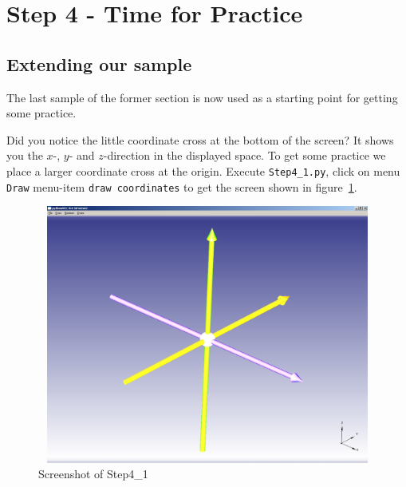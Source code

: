 \section{Step 4 - Time for Practice}
\subsection{Extending our sample}
The last sample of the former section is now used as a starting point for getting some practice.

Did you notice the little coordinate cross at the bottom of the screen? 
It shows you the $x$-, $y$- and $z$-direction in the displayed space.
To get some practice we place a larger coordinate cross at the origin.
Execute {\tt Step4\_1.py}, click on menu {\tt Draw} menu-item  {\tt draw coordinates} to get the screen shown in figure~\ref{STEP_4_1_SCREEN}.
\begin{figure}[h]
\begin{center}
\includegraphics[height=8.5cm,width=11.3cm]{Step4_1.jpg}
\end{center}
\caption[Screenshot of Step4\_1]{\label{STEP_4_1_SCREEN}Screenshot of Step4\_1}
\end{figure}

